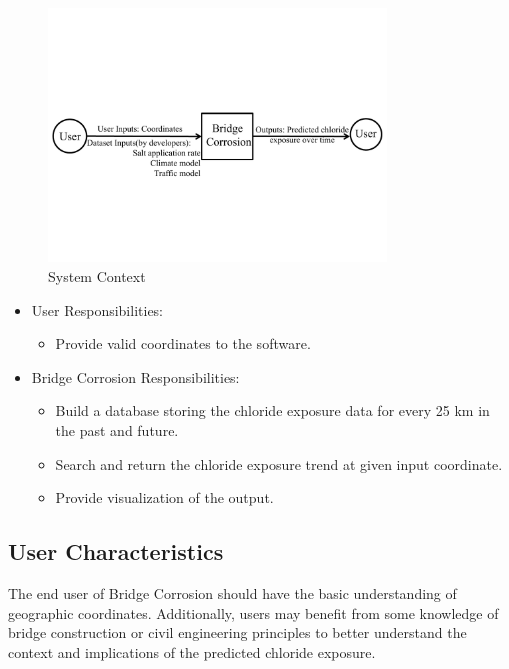 \documentclass[12pt]{article}
\begin{document}
\begin{figure}[h!]
\begin{center}
 \includegraphics[width=0.8\textwidth]{SystemContextFigure}
\caption{System Context}
\label{Fig_SystemContext} 
\end{center}
\end{figure}

\begin{itemize}
\item User Responsibilities:
\begin{itemize}
\item Provide valid coordinates to the software.
\end{itemize}
\item Bridge Corrosion Responsibilities:
\begin{itemize}
\item Build a database storing the chloride exposure data for every 25 km in the past and future.
\item Search and return the chloride exposure trend at given input coordinate.
\item Provide visualization of the output.
\end{itemize}
\end{itemize}

\subsection{User Characteristics} \label{SecUserCharacteristics}
The end user of Bridge Corrosion should have the basic understanding of geographic coordinates. Additionally, users may benefit from some knowledge of bridge construction or civil engineering principles to better understand the context and implications of the predicted chloride exposure.
\end{document}
